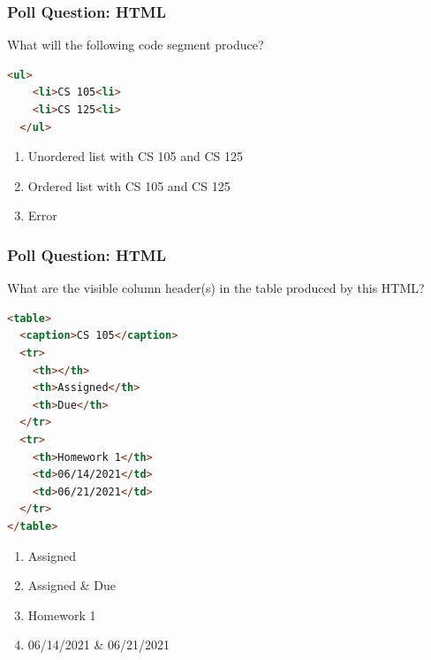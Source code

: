 \documentclass{beamer}
\begin{document}
%
%
\begin{frame}[fragile]
  \frametitle{Poll Question: HTML}
  What will the following code segment produce?\\
  \begin{lstlisting}[language=html,autogobble]
  <ul>
    <li>CS 105<li>
    <li>CS 125<li>
  </ul>
  \end{lstlisting} 
  \vfill
  \begin{enumerate}[A]
    \item Unordered list with CS 105 and CS 125
    \item Ordered list with CS 105 and CS 125
    \item Error
  \end{enumerate}
\end{frame}

%
%
\begin{frame}[fragile]
  \frametitle{Poll Question: HTML}
  What are the visible column header(s) in the table produced by this HTML?\\
  \begin{minipage}{0.49\textwidth}
    \begin{lstlisting}[language=html]
<table>
  <caption>CS 105</caption>
  <tr>
    <th></th>
    <th>Assigned</th>
    <th>Due</th>
  </tr>
  <tr>
    <th>Homework 1</th>
    <td>06/14/2021</td>
    <td>06/21/2021</td>
  </tr>
</table>
    \end{lstlisting} 
  \end{minipage}
  \hfill
  \begin{minipage}{0.45\textwidth}
    \begin{enumerate}[A]
      \item Assigned
      \item Assigned \& Due
      \item Homework 1
      \item 06/14/2021 \& 06/21/2021
    \end{enumerate}
  \end{minipage}
\end{frame}
\end{document}
